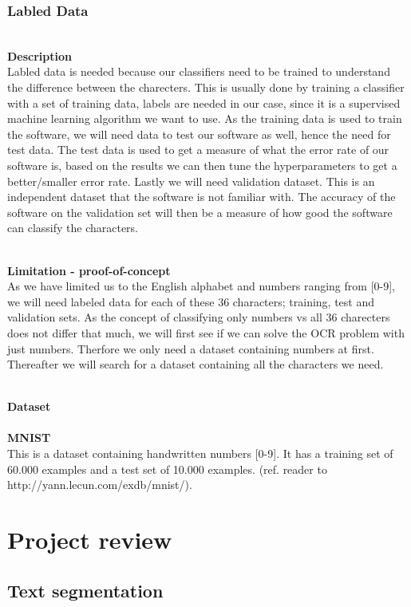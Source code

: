 \documentclass[11pt,a4paper,UKenglish]{article}
\begin{document}
\subsubsection{Labled Data}
\noindent \\ \textbf{Description}
\noindent \\
Labled data is needed because our classifiers need to be trained to understand
the difference between the charecters. This is usually done by training a
classifier with a set of training data, labels are needed in our case,
since it is a supervised machine learning algorithm we want to use. As the
training data is used to train the software, we will need data to test our
software as well, hence the need for test data. The test data is used to get a
measure of what the error rate of our software is, based on the results we
can then tune the hyperparameters to get a better/smaller error rate. Lastly
we will need validation dataset. This is an independent dataset that the software
is not familiar with. The accuracy of the software on the validation set will
then be a measure of how good the software can classify the characters.

\noindent \\ \textbf{Limitation - proof-of-concept}
\noindent \\
As we have limited us to the English alphabet and numbers ranging from [0-9],
we will need labeled data for each of these 36 characters; training, test and
validation sets. As the concept of classifying only numbers vs all 36
charecters does not differ that much, we will first see if we can solve the OCR
problem with just numbers. Therfore we only need a dataset containing numbers
at first. Thereafter we will search for a dataset containing all the characters
we need.

\noindent \\ \textbf{Dataset}
\noindent \\
\noindent \\ \textbf{MNIST}
\noindent \\ This is a dataset containing handwritten numbers [0-9].
It has a training set of 60.000 examples and a test set of 10.000 examples.
(ref. reader to http://yann.lecun.com/exdb/mnist/).



\section{Project review}
\label{sec:Project review}
\subsection{Text segmentation}
\end{document}
